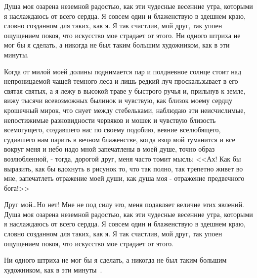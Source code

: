 
Душа моя озарена неземной радостью, как эти чудесные весенние утра, которыми я
наслаждаюсь от всего сердца. Я совсем один и блаженствую в здешнем краю,
словно созданном для таких, как я. Я так счастлив, мой друг, так упоен
ощущением покоя, что искусство мое страдает от этого. Ни одного штриха не мог
бы я сделать, а никогда не был таким большим художником, как в эти минуты.

Когда от милой моей долины поднимается пар и полдневное солнце стоит над
непроницаемой чащей темного леса и лишь редкий луч проскальзывает в его святая
святых, а я лежу в высокой траве у быстрого ручья и, прильнув к земле, вижу
тысячи всевозможных былинок и чувствую, как близок моему сердцу крошечный
мирок, что снует между стебельками, наблюдаю эти неисчислимые, непостижимые
разновидности червяков и мошек и чувствую близость всемогущего, создавшего нас
по своему подобию, веяние вселюбящего, судившего нам парить в вечном
блаженстве, когда взор мой туманится и все вокруг меня и небо надо мной
запечатлены в моей душе, точно образ возлюбленной, - тогда, дорогой друг, меня
часто томит мысль: <<Ах! Как бы выразить, как бы вдохнуть в рисунок то, что
так полно, так трепетно живет во мне, запечатлеть отражение моей души, как
душа моя - отражение предвечного бога!>>

Друг мой\dots Но нет! Мне не под силу это, меня подавляет величие этих
явлений. Душа моя озарена неземной радостью, как эти чудесные весенние утра,
которыми я наслаждаюсь от всего сердца. Я совсем один и блаженствую в здешнем
краю, словно созданном для таких, как я. Я так счастлив, мой друг, так упоен
ощущением покоя, что искусство мое страдает от этого.

Ни одного штриха не мог бы я сделать, а никогда не был таким большим
художником, как в эти минуты~\cite{podbelsky2015kurs}.
